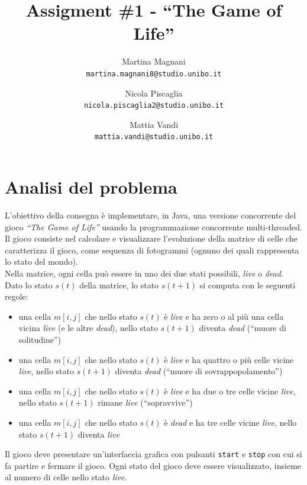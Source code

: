 \documentclass[a4paper]{article}
\title{\LARGE \bf
Assigment \#1 - ``The Game of Life''
}
\author{
    Martina Magnani\\
    \texttt{martina.magnani8@studio.unibo.it}
    \and
    Nicola Piscaglia\\
    \texttt{nicola.piscaglia2@studio.unibo.it}
    \and
    Mattia Vandi\\
    \texttt{mattia.vandi@studio.unibo.it}
}
\date{}
\begin{document}
\maketitle

\section{Analisi del problema}\label{analisi-del-problema}

L'obiettivo della consegna è implementare, in Java, una versione concorrente del gioco \textit{``The Game of Life''} usando la programmazione concorrente multi-threaded.\\
Il gioco consiste nel calcolare e visualizzare l'evoluzione della matrice di celle che caratterizza il gioco, come sequenza di fotogrammi (ognuno dei quali rappresenta lo stato del mondo).\\
Nella matrice, ogni cella può essere in uno dei due stati possibili, \textit{live} o \textit{dead}.\\
Dato lo stato \(s\left(t\right)\) della matrice, lo stato \(s\left(t + 1\right)\) si computa con le seguenti regole:

\begin{itemize}
\item
  una cella \(m\left[i,j\right]\) che nello stato \(s\left(t\right)\) è \textit{live} e ha zero o al più una cella vicina \textit{live} (e le altre \textit{dead}), nello stato \(s\left(t + 1\right)\) diventa \textit{dead} (``muore di solitudine'')
\item
  una cella \(m\left[i,j\right]\) che nello stato \(s\left(t\right)\) è \textit{live} e ha quattro o più celle vicine \textit{live}, nello stato \(s\left(t + 1\right)\) diventa \textit{dead} (``muore di sovrappopolamento'')
\item
  una cella \(m\left[i,j\right]\) che nello stato \(s\left(t\right)\) è \textit{live} e ha due o tre celle vicine \textit{live}, nello stato \(s\left(t + 1\right)\) rimane \textit{live} (``sopravvive'')
\item
  una cella \(m\left[i,j\right]\) che nello stato \(s\left(t\right)\) è \textit{dead} e ha tre celle vicine \textit{live}, nello stato \(s\left(t + 1\right)\) diventa \textit{live}
\end{itemize}
Il gioco deve presentare un'interfaccia grafica con pulsanti \texttt{start} e \texttt{stop} con cui si fa partire e fermare il gioco.
Ogni stato del gioco deve essere visualizzato, insieme al numero di celle nello stato \textit{live}.
\end{document}
